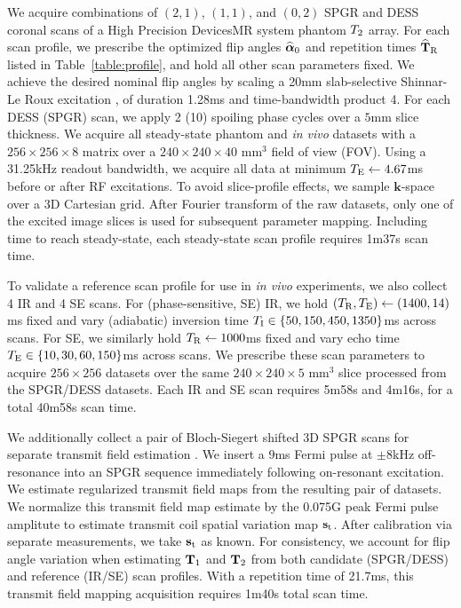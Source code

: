 We acquire combinations 
of $(2,1)$, $(1,1)$, and $(0,2)$ SPGR and DESS coronal scans 
of a High Precision Devices\regis MR system phantom $T_2$ array.
For each scan profile, 
we prescribe the optimized flip angles $\widehat{\boldsymbol{\alpha}}_0$ 
and repetition times $\widehat{\mathbf{T}}_{\mathrm{R}}$ 
listed in Table~\ref{table:profile},
 and hold all other scan parameters fixed. 
We achieve the desired nominal flip angles 
by scaling a 20mm slab-selective Shinnar-Le Roux excitation \cite{pauly:91:prf}, 
of duration 1.28ms and time-bandwidth product 4. 
For each DESS (SPGR) scan, 
we apply 2 (10) spoiling phase cycles 
over a $5$mm slice thickness. 
We acquire all steady-state phantom and \emph{in vivo} datasets 
with a $256 \times 256 \times 8$ matrix 
over a $240 \times 240 \times 40$ mm$^3$ field of view (FOV). 
Using a 31.25kHz readout bandwidth, 
we acquire all data at minimum $T_\mathrm{E} \gets 4.67$ms 
before or after RF excitations. 
To avoid slice-profile effects, 
we sample $\mathbf{k}$-space over a 3D Cartesian grid. 
After Fourier transform of the raw datasets, 
only one of the excited image slices 
is used for subsequent parameter mapping. 
Including time to reach steady-state, 
each steady-state scan profile requires 1m37s scan time.

To validate a reference scan profile 
for use in \emph{in vivo} experiments, 
we also collect 4 IR and 4 SE scans.
For (phase-sensitive, SE) IR, 
we hold $(T_\mathrm{R}, T_\mathrm{E}) \gets (1400, 14)$ms fixed 
and vary (adiabatic) inversion time 
$\TI \in \set{50, 150, 450, 1350}$ms across scans.
For SE, we similarly hold $T_\mathrm{R} \gets 1000$ms fixed 
and vary echo time $\TE \in \set{10, 30, 60, 150}$ms across scans.
We prescribe these scan parameters 
to acquire $256 \times 256$ datasets 
over the same $240 \times 240 \times 5$ mm$^3$ slice processed 
from the SPGR/DESS datasets. 
Each IR and SE scan requires 5m58s and 4m16s, 
for a total 40m58s scan time.

We additionally collect a pair 
of Bloch-Siegert shifted 3D SPGR scans 
for separate transmit field estimation 
\cite{sacolick:10:bmb}. 
We insert a 9ms Fermi pulse 
at $\pm8$kHz off-resonance
into an SPGR sequence immediately following on-resonant excitation.
We estimate regularized transmit field maps \cite{sun:14:reo}
from the resulting pair of datasets.
We normalize this transmit field map estimate
by the 0.075G peak Fermi pulse amplitute
to estimate transmit coil spatial variation map $\mathbf{s}_\mathrm{t}$.
After calibration via separate measurements,
we take $\mathbf{s}_\mathrm{t}$ as known.
For consistency, we account for flip angle variation 
when estimating $\mathbf{T}_1$ and $\mathbf{T}_2$ 
from both candidate (SPGR/DESS) 
and reference (IR/SE) scan profiles.
With a repetition time of 21.7ms, 
this transmit field mapping acquisition requires 
1m40s total scan time.

